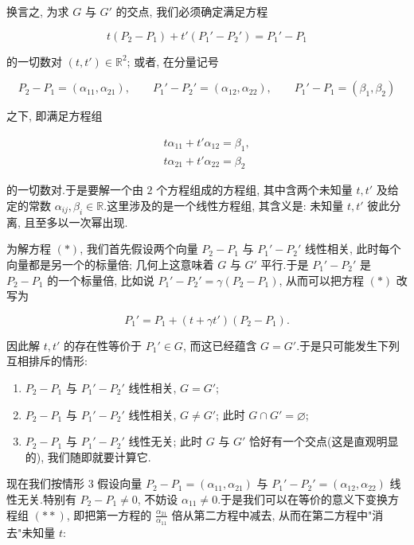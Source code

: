 换言之, 为求 $G$ 与 $G'$ 的交点, 我们必须确定满足方程

\begin{equation}
t(P_2 - P_1) + t'(P_1' - P_2') = P_1' - P_1 \tag{$*$}
\end{equation}

的一切数对 $(t, t') \in \mathbb{R}^2$; 或者, 在分量记号

\[
P_2 - P_1 = (\alpha_{11}, \alpha_{21}), \qquad
P_1' - P_2' = (\alpha_{12}, \alpha_{22}), \qquad
P_1' - P_1 = (\beta_1, \beta_2)
\]

之下, 即满足方程组

\begin{equation}
\begin{array}{c}
t\alpha_{11} + t'\alpha_{12} = \beta_1, \\
t\alpha_{21} + t'\alpha_{22} = \beta_2
\end{array} \tag{$**$}
\end{equation}

的一切数对.于是要解一个由 $2$ 个方程组成的方程组, 其中含两个未知量 $t, t'$ 及给定的常数 $\alpha_{ij}, \beta_i \in \mathbb{R}$.这里涉及的是一个线性方程组, 其含义是: 未知量 $t, t'$ 彼此分离, 且至多以一次幂出现.

为解方程 $(*)$, 我们首先假设两个向量 $P_2 - P_1$ 与 $P_1' - P_2'$ 线性相关, 此时每个向量都是另一个的标量倍; 几何上这意味着 $G$ 与 $G'$ 平行.于是 $P_1' - P_2'$ 是 $P_2 - P_1$ 的一个标量倍, 比如说 $P_1' - P_2' = \gamma(P_2 - P_1)$, 从而可以把方程 $(*)$ 改写为

\[
P_1' = P_1 + (t + \gamma t')(P_2 - P_1)\text{.}
\]

因此解 $t, t'$ 的存在性等价于 $P_1' \in G$, 而这已经蕴含 $G = G'$.于是只可能发生下列互相排斥的情形:

\begin{enumerate}
\item $P_2 - P_1$ 与 $P_1' - P_2'$ 线性相关, $G = G'$;
\item $P_2 - P_1$ 与 $P_1' - P_2'$ 线性相关, $G \neq G'$; 此时 $G \cap G' = \varnothing$;
\item $P_2 - P_1$ 与 $P_1' - P_2'$ 线性无关; 此时 $G$ 与 $G'$ 恰好有一个交点(这是直观明显的), 我们随即就要计算它.
\end{enumerate}

现在我们按情形 3 假设向量 $P_2 - P_1 = (\alpha_{11}, \alpha_{21})$ 与 $P_1' - P_2' = (\alpha_{12}, \alpha_{22})$ 线性无关.特别有 $P_2 - P_1 \neq 0$, 不妨设 $\alpha_{11} \neq 0$.于是我们可以在等价的意义下变换方程组 $(**)$, 即把第一方程的 $\frac{\alpha_{21}}{\alpha_{11}}$ 倍从第二方程中减去, 从而在第二方程中"消去"未知量 $t$:

